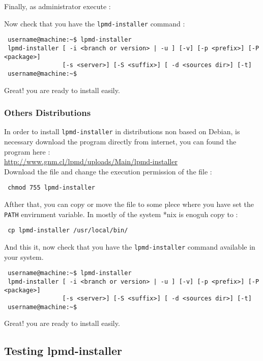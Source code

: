 Finally, as administrator execute :

Now check that you have the \verb|lpmd-installer| command :
\begin{verbatim}
 username@machine:~$ lpmd-installer 
 lpmd-installer [ -i <branch or version> | -u ] [-v] [-p <prefix>] [-P <package>] 
                [-s <server>] [-S <suffix>] [ -d <sources dir>] [-t]
 username@machine:~$
\end{verbatim}

Great! you are ready to install {\lpmd} easily.

\subsubsection{Others Distributions}

In order to install \verb|lpmd-installer| in distributions non based on Debian,
is necessary download the program directly from internet, you can found the
program here :\\

\url{http://www.gnm.cl/lpmd/uploads/Main/lpmd-installer}\\

Download the file and change the execution permission of the file :

\begin{verbatim}
 chmod 755 lpmd-installer
\end{verbatim}

Afther that, you can copy or move the file to some plece where you have set the
\verb|PATH| envirnment variable. In mostly of the system *nix is enoguh copy to
:

\begin{verbatim}
 cp lpmd-installer /usr/local/bin/
\end{verbatim}

And this it, now check that you have the \verb|lpmd-installer| command
available in your system.
\begin{verbatim}
 username@machine:~$ lpmd-installer 
 lpmd-installer [ -i <branch or version> | -u ] [-v] [-p <prefix>] [-P <package>] 
                [-s <server>] [-S <suffix>] [ -d <sources dir>] [-t]
 username@machine:~$
\end{verbatim}

Great! you are ready to install {\lpmd} easily.

\subsection{Testing lpmd-installer}

